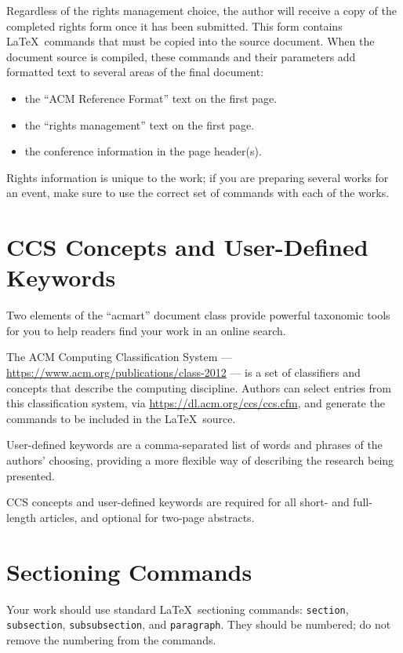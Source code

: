 \documentclass[sigchi]{acmart}
\begin{document}
Regardless of the rights management choice, the author will receive a
copy of the completed rights form once it has been submitted. This
form contains \LaTeX\ commands that must be copied into the source
document. When the document source is compiled, these commands and
their parameters add formatted text to several areas of the final
document:
\begin{itemize}
\item the ``ACM Reference Format'' text on the first page.
\item the ``rights management'' text on the first page.
\item the conference information in the page header(s).
\end{itemize}

Rights information is unique to the work; if you are preparing several
works for an event, make sure to use the correct set of commands with
each of the works.

\section{CCS Concepts and User-Defined Keywords}

Two elements of the ``acmart'' document class provide powerful
taxonomic tools for you to help readers find your work in an online
search.

The ACM Computing Classification System ---
\url{https://www.acm.org/publications/class-2012} --- is a set of
classifiers and concepts that describe the computing
discipline. Authors can select entries from this classification
system, via \url{https://dl.acm.org/ccs/ccs.cfm}, and generate the
commands to be included in the \LaTeX\ source.

User-defined keywords are a comma-separated list of words and phrases
of the authors' choosing, providing a more flexible way of describing
the research being presented.

CCS concepts and user-defined keywords are required for all short- and
full-length articles, and optional for two-page abstracts.

\section{Sectioning Commands}

Your work should use standard \LaTeX\ sectioning commands:
\verb|section|, \verb|subsection|, \verb|subsubsection|, and
\verb|paragraph|. They should be numbered; do not remove the numbering
from the commands.
\end{document}
